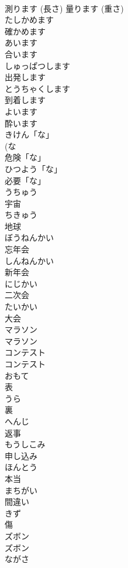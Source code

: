 \documentclass[8pt]{extreport}
\begin{document}
\begin{CJK}{UTF8}{min}
\\	測ります (長さ) 量ります (重さ)	
\\	たしかめます	
\\	確かめます	
\\	あいます	
\\	合います		
\\	しゅっぱつします	
\\	出発します	
\\	とうちゃくします	
\\	到着します	
\\	よいます	
\\	酔います		
\\	きけん「な」	
\\	(な 
\\	危険「な」	
\\	ひつよう「な」	
\\	必要「な」	
\\	うちゅう	
\\	宇宙		
\\	ちきゅう	
\\	地球		
\\	ぼうねんかい	
\\	忘年会		
\\	しんねんかい	
\\	新年会		
\\	にじかい	
\\	二次会		
\\	たいかい	
\\	大会		
\\	マラソン	
\\	マラソン		
\\	コンテスト	
\\	コンテスト		
\\	おもて	
\\	表		
\\	うら	
\\	裏		
\\	へんじ	
\\	返事	
\\	もうしこみ	
\\	申し込み	
\\	ほんとう	
\\	本当	
\\	まちがい	
\\	間違い		
\\	きず	
\\	傷		
\\	ズボン	
\\	ズボン		
\\	ながさ	

\end{CJK}
\end{document}
